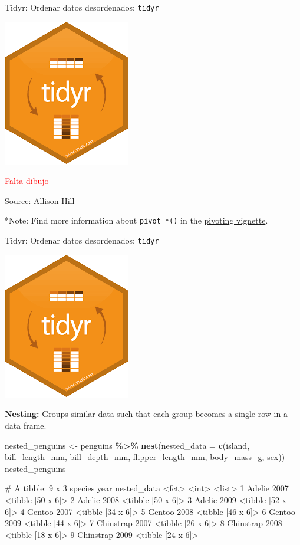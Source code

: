 \documentclass[
  ignorenonframetext,
  aspectratio=169]{beamer}
\newenvironment{Shaded}{\begin{snugshade}}{\end{snugshade}}
\newcommand{\AttributeTok}[1]{\textcolor[rgb]{0.13,0.29,0.53}{#1}}
\newcommand{\FunctionTok}[1]{\textcolor[rgb]{0.13,0.29,0.53}{\textbf{#1}}}
\newcommand{\NormalTok}[1]{#1}
\newcommand{\OtherTok}[1]{\textcolor[rgb]{0.56,0.35,0.01}{#1}}
\newcommand{\SpecialCharTok}[1]{\textcolor[rgb]{0.81,0.36,0.00}{\textbf{#1}}}
\let\oldverbatim\verbatim
\let\endoldverbatim\endverbatim
\renewenvironment{verbatim}{\tiny\oldverbatim}{\endoldverbatim}
\newcommand\red[1]{\textcolor{red}{#1}}
\begin{document}
\begin{frame}[fragile]{Tidyr: Ordenar datos desordenados:
\texttt{tidyr}}
\label{tidyr-ordenar-datos-desordenados-tidyr-3}
\begin{flushright}\includegraphics[width=0.05\linewidth]{Imgs/logo_tidyr} \end{flushright}

\red{Falta dibujo}

Source:
\href{https://github.com/apreshill/teachthat/blob/master/pivot/pivot_longer_smaller.gif}{Allison
Hill}

*Note: Find more information about \texttt{pivot\_*()} in the
\href{https://tidyr.tidyverse.org/articles/pivot.html}{pivoting
vignette}.
\end{frame}

\begin{frame}[fragile]{Tidyr: Ordenar datos desordenados:
\texttt{tidyr}}
\label{tidyr-ordenar-datos-desordenados-tidyr-4}
\begin{flushright}\includegraphics[width=0.05\linewidth]{Imgs/logo_tidyr} \end{flushright}

\textbf{Nesting:} Groups similar data such that each group becomes a
single row in a data frame.

\begin{Shaded}
\begin{Highlighting}[]
\NormalTok{nested\_penguins }\OtherTok{\textless{}{-}} 
\NormalTok{  penguins }\SpecialCharTok{\%\textgreater{}\%} 
    \FunctionTok{nest}\NormalTok{(}\AttributeTok{nested\_data =} 
           \FunctionTok{c}\NormalTok{(island, bill\_length\_mm, }
\NormalTok{             bill\_depth\_mm, flipper\_length\_mm,}
\NormalTok{             body\_mass\_g, sex))}
\NormalTok{nested\_penguins}
\end{Highlighting}
\end{Shaded}

\begin{verbatim}
# A tibble: 9 x 3
  species    year nested_data      
  <fct>     <int> <list>           
1 Adelie     2007 <tibble [50 x 6]>
2 Adelie     2008 <tibble [50 x 6]>
3 Adelie     2009 <tibble [52 x 6]>
4 Gentoo     2007 <tibble [34 x 6]>
5 Gentoo     2008 <tibble [46 x 6]>
6 Gentoo     2009 <tibble [44 x 6]>
7 Chinstrap  2007 <tibble [26 x 6]>
8 Chinstrap  2008 <tibble [18 x 6]>
9 Chinstrap  2009 <tibble [24 x 6]>
\end{verbatim}
\end{frame}
\end{document}
